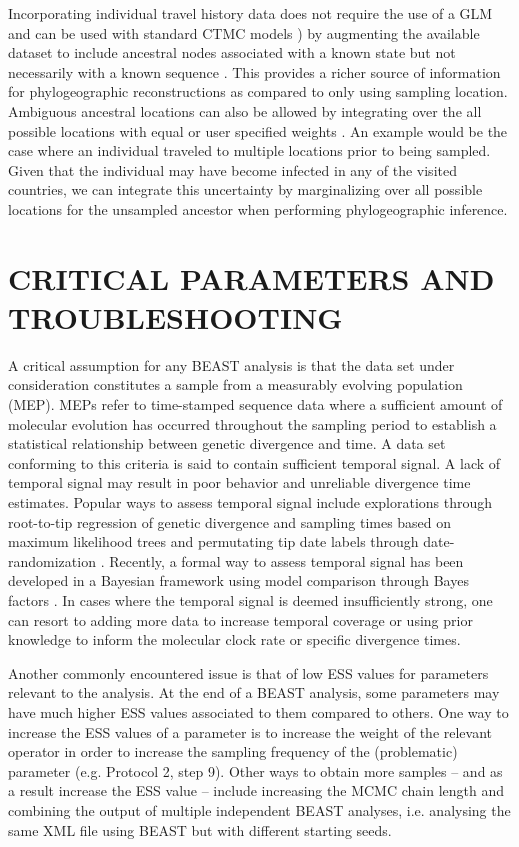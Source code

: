 \documentclass{article}
\begin{document}
\begin{multicols}{2}
Incorporating individual travel history data does not require the use of a GLM and can be used with standard CTMC models \cite{dta}) by augmenting the available dataset to include ancestral nodes associated with a known state but not necessarily with a known sequence \cite{travhist}.
This provides a richer source of information for phylogeographic reconstructions as compared to only using sampling location.
Ambiguous ancestral locations can also be allowed by integrating over the all possible locations with equal or user specified weights \cite{ambig}.
An example would be the case where an individual traveled to multiple locations prior to being sampled.
Given that the individual may have become infected in any of the visited countries, we can integrate this uncertainty by marginalizing over all possible locations for the unsampled ancestor when performing phylogeographic inference.


\section*{CRITICAL PARAMETERS AND TROUBLESHOOTING}

A critical assumption for any BEAST analysis is that the data set under consideration constitutes a sample from a measurably evolving population (MEP). MEPs \cite{mep1,mep2} refer to time-stamped sequence data where a sufficient amount of molecular evolution has occurred throughout the sampling period to establish a statistical relationship between genetic divergence and time. A data set conforming to this criteria is said to contain sufficient temporal signal. A lack of temporal signal may result in poor behavior and unreliable divergence time estimates. Popular ways to assess temporal signal include explorations through root-to-tip regression of genetic divergence and sampling times based on maximum likelihood trees \cite{tempest} and permutating tip date labels through date-randomization \cite{tipdate}. Recently, a formal way to assess temporal signal has been developed in a Bayesian framework using model comparison through Bayes factors \cite{bets}. In cases where the temporal signal is deemed insufficiently strong, one can resort to adding more data to increase temporal coverage or using prior knowledge to inform the molecular clock rate or specific divergence times.

Another commonly encountered issue is that of low ESS values for parameters relevant to the analysis. At the end of a BEAST analysis, some parameters may have much higher ESS values associated to them compared to others. One way to increase the ESS values of a parameter is to increase the weight of the relevant operator in order to increase the sampling frequency of the (problematic) parameter (e.g. Protocol 2, step 9). Other ways to obtain more samples -- and as a result increase the ESS value -- include increasing the MCMC chain length and combining the output of multiple independent BEAST analyses, i.e. analysing the same XML file using BEAST but with different starting seeds.



\end{multicols}
\end{document}
